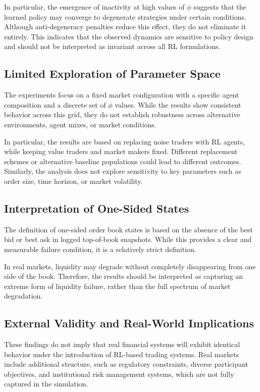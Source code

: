 \documentclass[11pt]{article}
\begin{document}
In particular, the emergence of inactivity at high values of $\phi$ suggests that the learned policy may converge to degenerate strategies under certain conditions. Although anti-degeneracy penalties reduce this effect, they do not eliminate it entirely. This indicates that the observed dynamics are sensitive to policy design and should not be interpreted as invariant across all RL formulations.

\subsection{Limited Exploration of Parameter Space}

The experiments focus on a fixed market configuration with a specific agent composition and a discrete set of $\phi$ values. While the results show consistent behavior across this grid, they do not establish robustness across alternative environments, agent mixes, or market conditions.

In particular, the results are based on replacing noise traders with RL agents, while keeping value traders and market makers fixed. Different replacement schemes or alternative baseline populations could lead to different outcomes. Similarly, the analysis does not explore sensitivity to key parameters such as order size, time horizon, or market volatility.

\subsection{Interpretation of One-Sided States}

The definition of one-sided order book states is based on the absence of the best bid or best ask in logged top-of-book snapshots. While this provides a clear and measurable failure condition, it is a relatively strict definition.

In real markets, liquidity may degrade without completely disappearing from one side of the book. Therefore, the results should be interpreted as capturing an extreme form of liquidity failure, rather than the full spectrum of market degradation.

\subsection{External Validity and Real-World Implications}

These findings do not imply that real financial systems will exhibit identical behavior under the introduction of RL-based trading systems. Real markets include additional structure, such as regulatory constraints, diverse participant objectives, and institutional risk management systems, which are not fully captured in the simulation.
\end{document}
